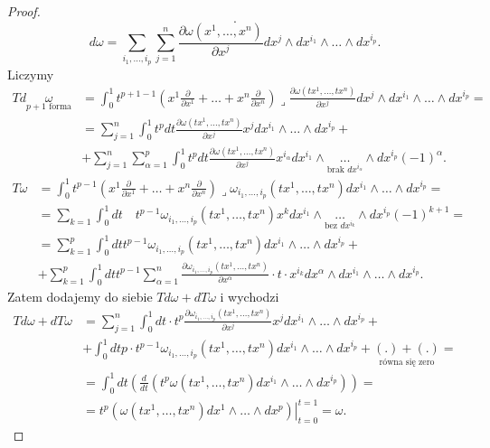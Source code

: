 \documentclass[../main.tex]{subfiles}
\begin{document}
\begin{proof}
\[.\]
\[
    d\omega = \sum_{i_1,\ldots,i_p}\sum_{j=1}^n \frac{\partial \omega(x^1,\ldots,x^n)}{\partial x^j} dx^j\land dx^{i_1}\land \ldots \land dx^{i_p}
.\]
Liczymy
\begin{align*}
    Td\underset{p+1\text{ forma}}{\omega} &= \int_0^1t^{p+1-1}\left( x^1 \frac{\partial }{\partial x^1} + \ldots + x^n \frac{\partial }{\partial x^n}  \right)\lrcorner \frac{\partial \omega(tx^1,\ldots,tx^n)}{\partial x^j} dx^j\land dx^{i_1}\land \ldots\land dx^{i_p} = \\
    &= \sum_{j=1}^n \int_0^1 t^p dt\frac{\partial \omega(tx^1,\ldots,tx^n)}{\partial x^j}x^jdx^{i_1}\land \ldots\land dx^{i_p} +\\
    &+\sum_{j=1}^n\sum_{\alpha = 1}^p \int_0^1 t^p dt \frac{\partial \omega(tx^1,\ldots,tx^n)}{\partial x^j}x^{i_\alpha}dx^{i_1}\land\underset{\text{brak }dx^{i_\alpha}}{\ldots} \land dx^{i_p}(-1)^{\alpha}
.\end{align*}
\begin{align*}
    T\omega &= \int_0^1 t^{p-1} \left(x^1 \frac{\partial }{\partial x^1} + \ldots + x^n \frac{\partial }{\partial x^n} \right)\lrcorner \omega_{i_1,\ldots,i_p} (tx^1, \ldots, tx^n) dx^{i_1}\land \ldots\land dx^{i_p} = \\
    &= \sum_{k = 1}^{}\int_0^1dt\quad t^{p-1} \omega_{i_1,\ldots,i_p}(tx^1,\ldots,tx^n)x^kdx^{i_1}\land \underset{\text{bez }dx^{i_k}}{\ldots}\land dx^{i_p}(-1)^{k+1} = \\
    &= \sum_{k=1}^p \int_0^1 dt t^{p-1} \omega_{i_1,\ldots,i_p}(tx^1,\ldots,tx^n)dx^{i_1}\land \ldots\land dx^{i_p} +\\
    &+\sum_{k=1}^p \int_0^1 dt t^{p-1} \sum_{\alpha = 1}^n \frac{\partial \omega_{i_1,\ldots,i_p}(tx^1,\ldots,tx^n)}{\partial x^\alpha}\cdot t\cdot  x^{i_k}dx^\alpha\land dx^{i_1}\land \ldots\land dx^{i_p}
.\end{align*}
Zatem dodajemy do siebie $Td\omega + dT\omega$ i wychodzi
\begin{align*}
    Td\omega + dT\omega &= \sum_{j = 1}^n\int_0^1dt\cdot t^p \frac{\partial \omega_{i_1,\ldots,i_p}(tx^1,\ldots,tx^n)}{\partial x^j} x^j dx^{i_1}\land \ldots\land dx^{i_p} +\\
    &+ \int_0^1dt p\cdot t^{p-1}\omega_{i_1,\ldots,i_p}(tx^1,\ldots,tx^n)dx^{i_1}\land \ldots\land dx^{i_p} + \underset{\text{równa się zero}}{\left( . \right) + \left( . \right)} = \\
    &= \int_0^1dt\left(\frac{d}{dt}\left( t^p \omega(tx^1,\ldots,tx^n)dx^{i_1}\land \ldots\land dx^{i_p}\right)\right) =\\
    &= t^p\left.\left(\omega(tx^1,\ldots,tx^n)dx^1\land\ldots\land dx^p\right)\right|_{t = 0}^{t = 1} = \omega
.\end{align*}

\end{proof}
\end{document}
